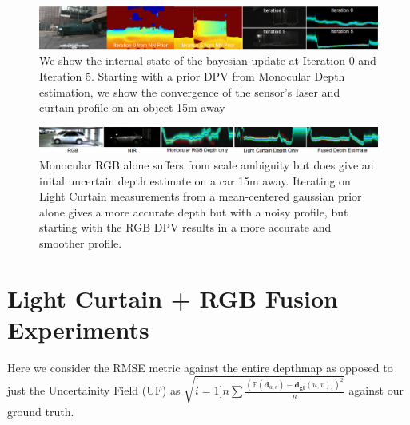 \begin{figure}[h!]
  \includegraphics[width=1.0\textwidth]{figures/p6.png}
  \caption{We show the internal state of the bayesian update at Iteration 0 and Iteration 5. Starting with a prior DPV from Monocular Depth estimation, we show the convergence of the sensor's laser and curtain profile on an object 15m away}  
  \label{fig:images4} 
\end{figure}

\begin{figure}[h!]
   \includegraphics[width=1.0\textwidth]{figures/lastone4.png}
   \caption{Monocular RGB alone suffers from scale ambiguity but does give an inital uncertain depth estimate on a car 15m away. Iterating on Light Curtain measurements from a mean-centered gaussian prior alone gives a more accurate depth but with a noisy profile, but starting with the RGB DPV results in a more accurate and smoother profile.}  
   \label{fig:images5} 
 \end{figure}


\section{Light Curtain + RGB Fusion Experiments} 

Here we consider the RMSE metric against the entire depthmap as opposed to just the Uncertainity Field (UF) as $\sqrt{\stackrel[i=1]{n}{\sum}\frac{\left(\mathbb{E}\left(\mathbf{d}_{u,v}\right)-\mathbf{d_{gt}}(u,v)_{i}\right)^{2}}{n}}$ against our ground truth.

